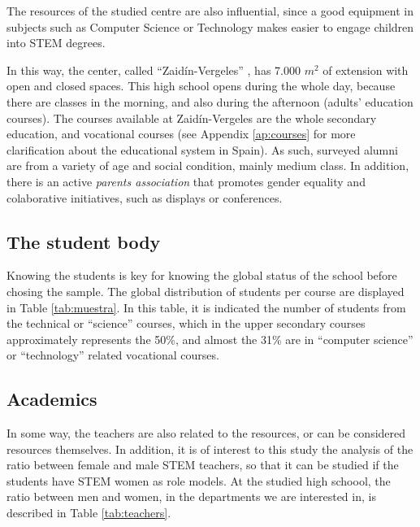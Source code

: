 \documentclass[journal,transmag]{IEEEtran}
\begin{document}
The resources of the studied centre are also influential, since a good equipment in subjects such as Computer Science or Technology makes easier to engage children into STEM degrees.

In this way, the center, called ``Zaid\'{i}n-Vergeles'' \cite{iesZV:2013}, has 7.000 $m^2$ of extension with open and closed spaces. This high school opens during the whole day, because there are classes in the morning, and also during the afternoon (adults' education courses). The courses available at Zaid\'{i}n-Vergeles are the whole secondary education, and vocational courses (see Appendix \ref{ap:courses} for more clarification about the educational system in Spain). As such, surveyed alumni are from a variety of age and social condition, mainly medium class. In addition, there is an active \textit{parents association} that promotes gender equality and colaborative initiatives, such as displays or conferences.

\subsection{The student body}

Knowing the students is key for knowing the global status of the school before chosing the sample. The global distribution of students per course are displayed in Table \ref{tab:muestra}. In this table, it is indicated the number of students from the technical or ``science'' courses, which in the upper secondary courses approximately represents the 50\%, and almost the 31\% are in ``computer science'' or ``technology'' related vocational courses.

\subsection{Academics}

In some way, the teachers are also related to the resources, or can be considered resources themselves. In addition, it is of interest to this study the analysis of the ratio between female and male STEM teachers, so that it can be studied if the students have STEM women as role models. At the studied high schoool, the ratio between men and women, in the departments we are interested in, is described in Table \ref{tab:teachers}.
\end{document}
